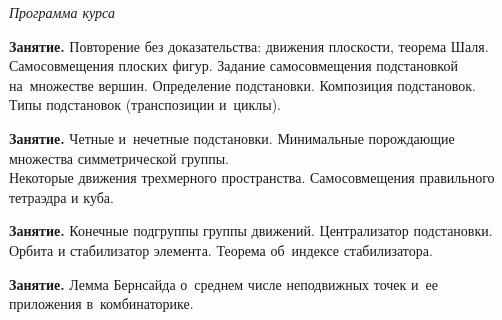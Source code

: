 



\vspace{-1ex}
\emph{Программа курса}
\vspace{+1ex}

\textbf{Занятие.}\enspace
Повторение без доказательства: движения плоскости, теорема Шаля.
\\
Самосовмещения плоских фигур.
Задание самосовмещения подстановкой на~множестве вершин.
Определение подстановки.
Композиция подстановок.
Типы подстановок (транспозиции и~циклы).

\textbf{Занятие.}\enspace
Четные и~нечетные подстановки.
Минимальные порождающие множества симметрической группы.
\\
Некоторые движения трехмерного пространства.
Самосовмещения правильного тетраэдра и куба. 

\textbf{Занятие.}\enspace
Конечные подгруппы группы движений.
Централизатор подстановки.
Орбита и стабилизатор элемента.
Теорема об~индексе стабилизатора.

\textbf{Занятие.}\enspace
Лемма Бернсайда о~среднем числе неподвижных точек и~ее приложения
в~комбинаторике.

